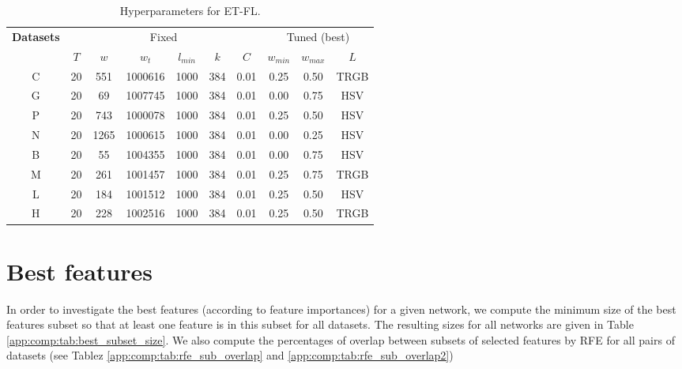 \begin{table}
	\centering
	\begin{tabular}{|c|c|c|c|c|c|c|c|c|c|}
    	\hline
        \multirow{2}{*}{\textbf{Datasets}} & \multicolumn{6}{c|}{Fixed} & \multicolumn{3}{c|}{Tuned (best)} \\ 
     	\cline{2-10}
		 & $T$ & $w$ & $w_t$ & $l_{min}$ & $k$ & $C$ & $w_{min}$ & $w_{max}$ & $L$ \\ 
     	\hline
        C & 20 &  551 & 1000616 & 1000 & 384 & 0.01 & 0.25 & 0.50 & TRGB \\
        G & 20 &   69 & 1007745 & 1000 & 384 & 0.01 & 0.00 & 0.75 &  HSV \\
        P & 20 &  743 & 1000078 & 1000 & 384 & 0.01 & 0.25 & 0.50 &  HSV \\
        N & 20 & 1265 & 1000615 & 1000 & 384 & 0.01 & 0.00 & 0.25 &  HSV \\
        B & 20 &   55 & 1004355 & 1000 & 384 & 0.01 & 0.00 & 0.75 &  HSV \\
        M & 20 &  261 & 1001457 & 1000 & 384 & 0.01 & 0.25 & 0.75 & TRGB \\
        L & 20 &  184 & 1001512 & 1000 & 384 & 0.01 & 0.25 & 0.50 &  HSV \\
        H & 20 &  228 & 1002516 & 1000 & 384 & 0.01 & 0.25 & 0.50 & TRGB \\
     	\hline
	\end{tabular}
    \caption{Hyperparameters for ET-FL.}
    \label{app:comp:tab:hyper_etfl}
\end{table}

\section{Best features}
\label{app:comp:sec:bestfeatures}

In order to investigate the best features (according to feature importances) for a given network, we compute the minimum size of the best features subset so that at least one feature is in this subset for all datasets. The resulting sizes for all networks are given in Table \ref{app:comp:tab:best_subset_size}. We also compute the percentages of overlap between subsets of selected features by RFE for all pairs of datasets (see Tablez \ref{app:comp:tab:rfe_sub_overlap} and \ref{app:comp:tab:rfe_sub_overlap2})

